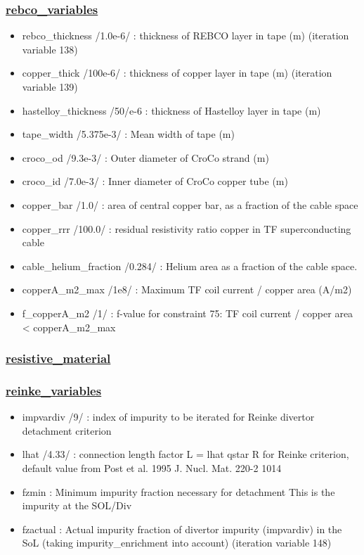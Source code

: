 \documentclass[]{article}
\begin{document}
\subsubsection{\href{rebco_variables.html}{rebco\_variables}}

\begin{itemize}
\itemsep1pt\parskip0pt
\item
  rebco\_thickness /1.0e-6/ : thickness of REBCO layer in tape (m)
  (iteration variable 138)
\item
  copper\_thick /100e-6/ : thickness of copper layer in tape (m)
  (iteration variable 139)
\item
  hastelloy\_thickness /50/e-6 : thickness of Hastelloy layer in tape
  (m)
\item
  tape\_width /5.375e-3/ : Mean width of tape (m)
\item
  croco\_od /9.3e-3/ : Outer diameter of CroCo strand (m)
\item
  croco\_id /7.0e-3/ : Inner diameter of CroCo copper tube (m)
\item
  copper\_bar /1.0/ : area of central copper bar, as a fraction of the
  cable space
\item
  copper\_rrr /100.0/ : residual resistivity ratio copper in TF
  superconducting cable
\item
  cable\_helium\_fraction /0.284/ : Helium area as a fraction of the
  cable space.
\item
  copperA\_m2\_max /1e8/ : Maximum TF coil current / copper area (A/m2)
\item
  f\_copperA\_m2 /1/ : f-value for constraint 75: TF coil current /
  copper area \textless{} copperA\_m2\_max
\end{itemize}

\subsubsection{\href{resistive_material.html}{resistive\_material}}

\subsubsection{\href{reinke_variables.html}{reinke\_variables}}

\begin{itemize}
\itemsep1pt\parskip0pt
\item
  impvardiv /9/ : index of impurity to be iterated for Reinke divertor
  detachment criterion
\item
  lhat /4.33/ : connection length factor L\textbar{}\textbar{} = lhat
  qstar R for Reinke criterion, default value from Post et al. 1995 J.
  Nucl. Mat. 220-2 1014
\item
  fzmin : Minimum impurity fraction necessary for detachment This is the
  impurity at the SOL/Div
\item
  fzactual : Actual impurity fraction of divertor impurity (impvardiv)
  in the SoL (taking impurity\_enrichment into account) (iteration
  variable 148)
\end{itemize}
\end{document}
